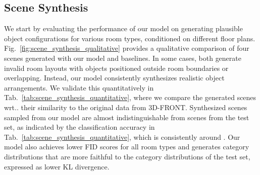 \documentclass{article}
\makeatletter
\DeclareRobustCommand\onedot{\futurelet\@let@token\@onedot}
\def\@onedot{\ifx\@let@token.\else.\null\fi\xspace}
\def\wrt{wrt\onedot}
\newcommand{\figref}[1]{Fig.~\ref{#1}}
\newcommand{\tabref}[1]{Tab.~\ref{#1}}
\makeatother
\begin{document}
\begin{table}
    \centering
    \vspace{0.2em}
    \caption{\small {\bf Quantitative Comparison.} We report the FID score
    () at  pixels, the KL divergence () between the
    distribution of object categories of synthesized and real scenes and the real vs. synthetic classification
    accuracy for all methods. Classification accuracy closer to  
    is better.}
    \vspace{-1.2em}
    \label{tab:scene_synthesis_quantitative}
\end{table}


\vspace{-2mm}
\subsection{Scene Synthesis}
We start by evaluating the performance of our model on generating
plausible object configurations for various room types, conditioned on
different floor plans. \figref{fig:scene_synthesis_qualitative} provides a
qualitative comparison of four scenes generated with our model and baselines.
In some cases, both \cite{Ritchie2019CVPR, Wang2020ARXIV} generate invalid room
layouts with objects positioned outside room boundaries or overlapping.
Instead, our model consistently synthesizes realistic object
arrangements. We validate this quantitatively in
\tabref{tab:scene_synthesis_quantitative}, where we compare the generated
scenes \wrt their similarity to the original data from 3D-FRONT. Synthesized scenes
sampled from our model are almost indistinguishable from scenes from the test
set, as indicated by the classification accuracy in
\tabref{tab:scene_synthesis_quantitative}, which is consistently around .
Our model also achieves lower FID scores for all room types and
generates category distributions that are more faithful to the category
distributions of the test set, expressed as lower KL divergence.
\end{document}
